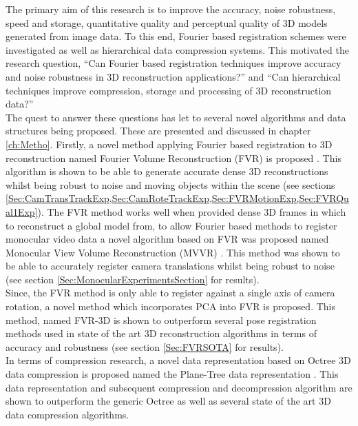 The primary aim of this research is to improve the accuracy, noise robustness, speed and storage, quantitative quality and perceptual quality of 3D models generated from image data. To this end, Fourier based registration schemes were investigated as well as hierarchical data compression systems. This motivated the research question, ``Can Fourier based registration techniques improve accuracy and noise robustness in 3D reconstruction applications?'' and ``Can hierarchical techniques improve compression, storage and processing of 3D reconstruction data?'' \\


The quest to answer these questions has let to several novel algorithms and data structures being proposed. These are presented and discussed in chapter \ref{ch:Metho}. Firstly, a novel method applying Fourier based registration to 3D reconstruction named Fourier Volume Reconstruction (FVR) is proposed \cite{Lincoln16Fourier,Lincoln16Dense}. This algorithm is shown to be able to generate accurate dense 3D reconstructions whilst being robust to noise and moving objects within the scene (see sections \ref{Sec:CamTransTrackExp,Sec:CamRoteTrackExp,Sec:FVRMotionExp,Sec:FVRQual1Exp}). The FVR method works well when provided dense 3D frames in which to reconstruct a global model from, to allow Fourier based methods to register monocular video data a novel algorithm based on FVR was proposed named Monocular View Volume Reconstruction (MVVR) \cite{Lincoln16Monocular}. This method was shown to be able to accurately register camera translations whilst being robust to noise (see section \ref{Sec:MonocularExperimentsSection} for results). \\

Since, the FVR method is only able to register against a single axis of camera rotation, a novel method which incorporates PCA into FVR is proposed. This method, named FVR-3D is shown to outperform several pose registration methods used in state of the art 3D reconstruction algorithms in terms of accuracy and robustness (see section \ref{Sec:FVRSOTA} for results). \\

In terms of compression research, a novel data representation based on Octree 3D data compression is proposed named the Plane-Tree data representation \cite{Lincoln15Plane}. This data representation and subsequent compression and decompression algorithm are shown to outperform the generic Octree as well as several state of the art 3D data compression algorithms. \\


